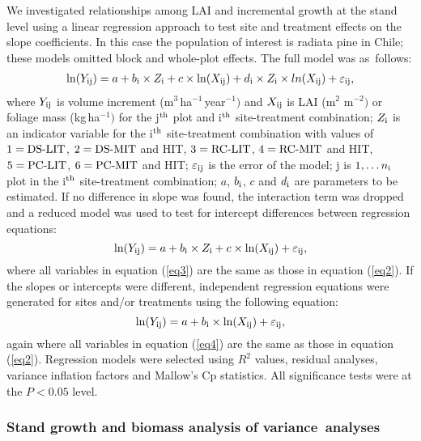 \documentclass[final]{foresj}
\begin{document}
We investigated relationships among LAI and incremental
growth at the stand level using a linear regression
approach to test site and treatment effects on the slope
coefficients.\cite{4} In this case the population of
interest is radiata pine in Chile; these models omitted
block and whole-plot effects. The full model was
as~follows:
\begin{align}\label{eq2}
\ln(Y_{{\rm ij}})=a + b_{{\rm i}} \times
Z_{{\rm i}} + c \times \ln(X_{{\rm ij}}) +
d_{{\rm i}} \times Z_{{\rm i}} \times
ln(X_{{\rm ij}}) + \varepsilon_{{\rm ij}},
\end{align}
where $Y_{{\rm ij}}$ is volume increment
(m$^{3}$\,ha$^{-1}$\,year$^{-1})$ and $X_{{\rm ij}}$ is LAI
(m$^{2}$ m$^{-2})$ or foliage mass (kg\,ha$^{-1})$ for the
j$^{{\rm th}}$ plot and i$^{{\rm th}}$ site-treatment
combination; $Z_{{\rm i}}$ is an indicator variable for the
i$^{{\rm th}}$ site-treatment combination with values of
$1=\hbox{DS-LIT}$, $2=\hbox{DS-MIT}$ and HIT,
$3=\hbox{RC-LIT}$, $4=\hbox{RC-MIT}$ and HIT,
$5=\hbox{PC-LIT}$, $6=\hbox{PC-MIT}$ and HIT;
$\varepsilon_{{\rm ij}}$ is the error of the model; j is
$1, \ldots n_{{\rm i}}$ plot in the i$^{{\rm th}}$
site-treatment combination; $a$, $b_{{\rm i}}$, $c$ and
$d_{{\rm i}}$ are parameters to be estimated. If no
difference in slope was found, the interaction term was
dropped and a reduced model was used to test for intercept
differences between regression equations:
\begin{equation}\label{eq3}
\ln(Y_{{\rm ij}})=a + b_{{\rm i}} \times
Z_{{\rm i}}  + c \times \ln(X_{{\rm ij}})  +
 \varepsilon_{{\rm ij}},
\end{equation}
where all variables in equation (\ref{eq3}) are the same as
those in equation (\ref{eq2}). If the slopes or intercepts
were different, independent regression equations were
generated for sites and/or treatments using the following
equation:
\begin{equation}\label{eq4}
\ln(Y_{{\rm ij}})=a  +  b_{{\rm i}} \times\ln(X_{{\rm ij}})  +  \varepsilon_{{\rm ij}},
\end{equation}
again where all variables in equation (\ref{eq4}) are the
same as those in equation (\ref{eq2}). Regression models
were selected using $R^{2}$ values, residual analyses,
variance inflation factors and Mallow's Cp
statistics.\cite{43} All significance tests were at the
$P<0.05$ level.

\subsubsection{Stand growth and biomass analysis of
variance~analyses}
\end{document}

